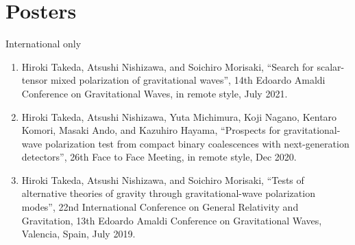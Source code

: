 \documentclass[12pt,a4paper]{article}
\begin{document}
\section*{Posters}
International only
\begin{enumerate}
\item Hiroki Takeda, Atsushi Nishizawa, and Soichiro Morisaki, “Search for scalar-tensor mixed polarization of gravitational waves”, 14th Edoardo Amaldi Conference on Gravitational Waves, in remote style, July 2021.

\item Hiroki Takeda, Atsushi Nishizawa, Yuta Michimura, Koji Nagano, Kentaro Komori, Masaki Ando, and Kazuhiro Hayama, “Prospects for gravitational-wave polarization test from compact binary coalescences with next-generation detectors”, 26th Face to Face Meeting, in remote style, Dec 2020.

\item Hiroki Takeda, Atsushi Nishizawa, and Soichiro Morisaki, “Tests of alternative theories of gravity through gravitational-wave polarization modes”, 22nd International Conference on General Relativity and Gravitation, 13th Edoardo Amaldi Conference on Gravitational Waves, Valencia, Spain, July 2019.


\end{enumerate}

\end{document}
